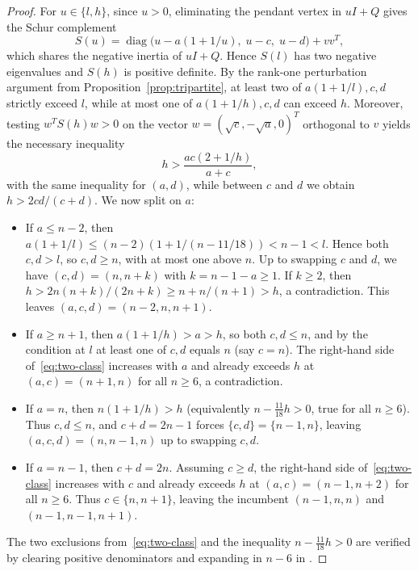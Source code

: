 \documentclass[10pt]{article}
\begin{document}
\begin{proof}
For $u \in \{l, h\}$, since $u > 0$, eliminating the pendant vertex in $uI + Q$ gives the Schur complement
\[
S(u) = \operatorname{diag}\bigl(u - a(1 + 1/u),\; u - c,\; u - d\bigr) + vv^T,
\]
which shares the negative inertia of $uI + Q$. Hence $S(l)$ has two negative eigenvalues and $S(h)$ is positive definite. By the rank-one perturbation argument from Proposition~\ref{prop:tripartite}, at least two of $a(1 + 1/l), c, d$ strictly exceed $l$, while at most one of $a(1 + 1/h), c, d$ can exceed $h$. Moreover, testing $w^T S(h) w > 0$ on the vector $w = (\sqrt{c}, -\sqrt{a}, 0)^T$ orthogonal to $v$ yields the necessary inequality
\begin{equation}\label{eq:two-class}
h > \frac{ac(2 + 1/h)}{a + c},
\end{equation}
with the same inequality for $(a, d)$, while between $c$ and $d$ we obtain $h > 2cd/(c + d)$. We now split on $a$:
\begin{itemize}
\item If $a \leq n - 2$, then $a(1 + 1/l) \leq (n - 2)(1 + 1/(n - 11/18)) < n - 1 < l$. Hence both $c, d > l$, so $c, d \geq n$, with at most one above $n$. Up to swapping $c$ and $d$, we have $(c, d) = (n, n + k)$ with $k = n - 1 - a \geq 1$. If $k \geq 2$, then $h > 2n(n + k)/(2n + k) \geq n + n/(n + 1) > h$, a contradiction. This leaves $(a, c, d) = (n - 2, n, n + 1)$.
\item If $a \geq n + 1$, then $a(1 + 1/h) > a > h$, so both $c, d \leq n$, and by the condition at $l$ at least one of $c, d$ equals $n$ (say $c = n$). The right-hand side of~\eqref{eq:two-class} increases with $a$ and already exceeds $h$ at $(a, c) = (n + 1, n)$ for all $n \geq 6$, a contradiction.
\item If $a = n$, then $n(1 + 1/h) > h$ (equivalently $n - \frac{11}{18}h > 0$, true for all $n \geq 6$). Thus $c, d \leq n$, and $c + d = 2n - 1$ forces $\{c, d\} = \{n - 1, n\}$, leaving $(a, c, d) = (n, n - 1, n)$ up to swapping $c, d$.
\item If $a = n - 1$, then $c + d = 2n$. Assuming $c \geq d$, the right-hand side of~\eqref{eq:two-class} increases with $c$ and already exceeds $h$ at $(a, c) = (n - 1, n + 2)$ for all $n \geq 6$. Thus $c \in \{n, n + 1\}$, leaving the incumbent $(n - 1, n, n)$ and $(n - 1, n - 1, n + 1)$.
\end{itemize}
The two exclusions from~\eqref{eq:two-class} and the inequality $n - \frac{11}{18}h > 0$ are verified by clearing positive denominators and expanding in $n - 6$ in \texttt{}.


\end{proof}
\end{document}
